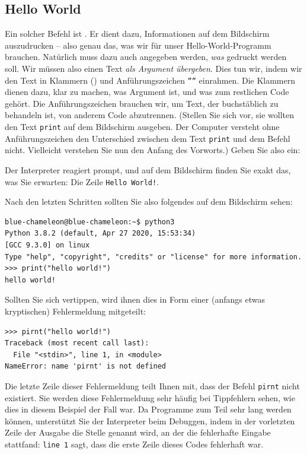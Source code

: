 \subsection{Hello World}
Ein solcher Befehl ist . Er dient dazu, Informationen auf dem Bildschirm auszudrucken -- also genau das, was wir für unser Hello-World-Programm brauchen. Natürlich muss dazu auch angegeben werden, \emph{was} gedruckt werden soll. Wir müssen also einen Text \emph{als Argument übergeben}. Dies tun wir, indem wir den Text in Klammern () und Anführungszeichen \texttt{''''} einrahmen. Die Klammern dienen dazu, klar zu machen, was Argument ist, und was zum restlichen Code gehört. Die Anführungszeichen brauchen wir, um Text, der buchstäblich zu behandeln ist, von anderem Code abzutrennen. (Stellen Sie sich vor, sie wollten den Text \texttt{print} auf dem Bildschirm ausgeben. Der Computer versteht ohne Anführungszeichen den Unterschied zwischen dem Text \texttt{print} und dem Befehl  nicht. Vielleicht verstehen Sie nun den Anfang des Vorworts.) Geben Sie also ein:

\begin{center}
\end{center}

Der Interpreter reagiert prompt, und auf dem Bildschirm finden Sie exakt das, was Sie erwarten: Die Zeile \texttt{Hello World!}.

Nach den letzten Schritten sollten Sie also folgendes auf dem Bildschirm sehen:
\begin{cmdbox}
\begin{verbatim}
blue-chameleon@blue-chameleon:~$ python3
Python 3.8.2 (default, Apr 27 2020, 15:53:34) 
[GCC 9.3.0] on linux
Type "help", "copyright", "credits" or "license" for more information.
>>> print("hello world!")
hello world!
\end{verbatim}
\end{cmdbox}

Sollten Sie sich vertippen, wird ihnen dies in Form einer (anfangs etwas kryptischen) Fehlermeldung mitgeteilt:
\begin{cmdbox}
\begin{verbatim}
>>> pirnt("hello world!")
Traceback (most recent call last):
  File "<stdin>", line 1, in <module>
NameError: name 'pirnt' is not defined
\end{verbatim}
\end{cmdbox}
Die letzte Zeile dieser Fehlermeldung teilt Ihnen mit, dass der Befehl \texttt{pirnt} nicht existiert. Sie werden diese Fehlermeldung sehr häufig bei Tippfehlern sehen, wie dies in diesem Beispiel der Fall war. Da Programme zum Teil sehr lang werden können, unterstützt Sie der Interpreter beim Debuggen, indem in der vorletzten Zeile der Ausgabe die Stelle genannt wird, an der die fehlerhafte Eingabe stattfand: \texttt{line 1} sagt, dass die erste Zeile dieses Codes fehlerhaft war.


